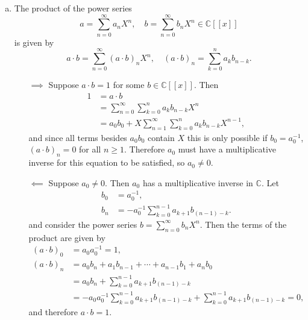 \documentclass{article}
\begin{document}
\begin{Answer}
  \begin{enumerate}[(a)]
    \item{
      The product of the power series
      $$
      a = \sum_{n=0}^\infty a_n X^n, \quad
      b = \sum_{n=0}^\infty b_n X^n \in \mathbb{C}[[x]]
      $$
      is given by
      $$
      a \cdot b = \sum_{n=0}^\infty(a \cdot b)_n X^n, \quad
      (a \cdot b)_n = \sum_{k=0}^n a_k b_{n-k}.
      $$
      \begin{itemize}
        \item[$\implies$]{
          Suppose $a \cdot b = 1$ for some $b \in
          \mathbb{C}[[x]]$. Then
          \begin{align*}
             1
          &= a \cdot b \\
          &= \sum_{n=0}^\infty \sum_{k=0}^n a_k b_{n-k} X^n \\
          &= a_0 b_0
           + X \sum_{n=1}^\infty \sum_{k=0}^n a_k b_{n-k} X^{n-1},
          \end{align*}
          and since all terms besides $a_0 b_0$ contain $X$ this is
          only possible if $b_0 = a_0^{-1}$, $(a \cdot b)_n = 0$ for
          all $n \geq 1$. Therefore $a_0$ must have a multiplicative
          inverse for this equation to be satisfied, so $a_0 \neq 0$.
        }
        \item[$\impliedby$]{
          Suppose $a_0 \neq 0$. Then $a_0$ has a multiplicative
          inverse in $\mathbb{C}$. Let
          \begin{align*}
            b_0 &= a_0^{-1}, \\
            b_n &= -a_0^{-1} \sum_{k=0}^{n-1} a_{k+1} b_{(n-1)-k}.
          \end{align*}
          and consider the power series $b = \sum_{n=0}^\infty b_n
          X^n$. Then the terms of the product are given by
          \begin{align*}
             (a \cdot b)_0
          &= a_0 a_0^{-1} = 1, \\
             (a \cdot b)_n
          &= a_0 b_n + a_1 b_{n-1} + \cdots + a_{n-1} b_1 + a_n b_0 \\
          &= a_0 b_n + \sum_{k=0}^{n-1} a_{k+1} b_{(n-1)-k} \\
          &= -a_0 a_0^{-1} \sum_{k=0}^{n-1} a_{k+1} b_{(n-1)-k}
           + \sum_{k=0}^{n-1} a_{k+1} b_{(n-1)-k}
           = 0,
          \end{align*}
          and therefore $a \cdot b = 1$.
        }
      \end{itemize}
}
\end{enumerate}
\end{Answer}
\end{document}
